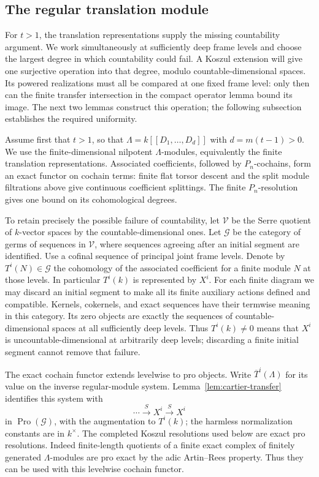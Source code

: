 \subsection{The regular translation module}

For $t>1$, the translation representations supply the missing
countability argument. We work simultaneously at sufficiently deep
frame levels and choose the largest degree in which countability
could fail. A Koszul extension will give one surjective operation
into that degree, modulo countable-dimensional spaces. Its powered
realizations must all be compared at one fixed frame level: only then
can the finite transfer intersection in the compact operator lemma
bound its image. The next two lemmas construct this operation; the
following subsection establishes the required uniformity.

Assume first that $t>1$, so that
$\Lambda=k[[D_1,\ldots,D_d]]$ with $d=m(t-1)>0$.
We use the finite-dimensional nilpotent $\Lambda$-modules, equivalently
the finite translation representations.  Associated coefficients,
followed by $P_n$-cochains, form an exact functor on cochain terms:
finite flat torsor descent and the split module filtrations above give
continuous coefficient splittings.  The finite $P_n$-resolution gives
one bound on its cohomological degrees.

To retain precisely the possible failure of countability, let
$\mathscr V$ be the Serre quotient of $k$-vector spaces by the
countable-dimensional ones.  Let $\mathscr G$ be the category of germs
of sequences in $\mathscr V$, where sequences agreeing after an initial
segment are identified.  Use a cofinal sequence of principal joint
frame levels.  Denote by $T^i(N)\in\mathscr G$ the cohomology of the
associated coefficient for a finite module $N$ at those levels.
In particular $T^i(k)$ is represented by $X^i$.
For each finite diagram we may discard an initial segment to make all
its finite auxiliary actions defined and compatible.  Kernels,
cokernels, and exact sequences have their termwise meaning in this
category.  Its zero objects are exactly the sequences of
countable-dimensional spaces at all sufficiently deep levels.
Thus $T^i(k)\ne0$ means that $X^i$ is uncountable-dimensional at
arbitrarily deep levels; discarding a finite initial segment cannot
remove that failure.

The exact cochain functor extends levelwise to pro objects.  Write
$\overline T^i(\Lambda)$ for its value on the inverse regular-module
system.  Lemma~\ref{lem:cartier-transfer} identifies this system with
\[
          \cdots\xrightarrow{S}X^i\xrightarrow{S}X^i
\]
in $\operatorname{Pro}(\mathscr G)$, with the augmentation to
$T^i(k)$; the harmless normalization constants are in $k^\times$.
The completed Koszul resolutions used below are exact pro resolutions.
Indeed finite-length quotients of a finite exact complex of finitely
generated $\Lambda$-modules are pro exact by the adic Artin--Rees
property.  Thus they can be used with this levelwise cochain functor.

